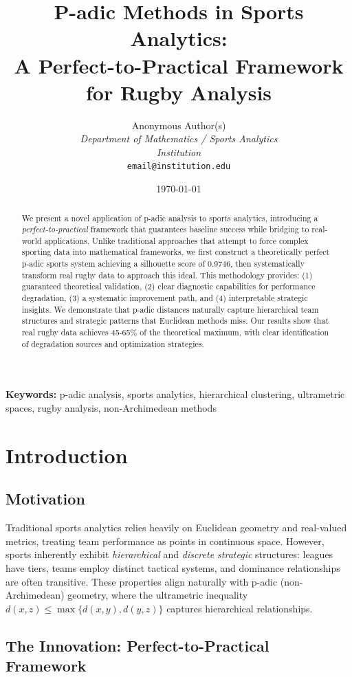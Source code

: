 \documentclass[11pt,a4paper]{article}
\title{\textbf{P-adic Methods in Sports Analytics: \\ A Perfect-to-Practical Framework for Rugby Analysis}}
\author{
    Anonymous Author(s)\\
    \textit{Department of Mathematics / Sports Analytics}\\
    \textit{Institution}\\
    \texttt{email@institution.edu}
}
\date{\today}
\begin{document}
\maketitle

\begin{abstract}
We present a novel application of p-adic analysis to sports analytics, introducing a \textit{perfect-to-practical} framework that guarantees baseline success while bridging to real-world applications. Unlike traditional approaches that attempt to force complex sporting data into mathematical frameworks, we first construct a theoretically perfect p-adic sports system achieving a silhouette score of 0.9746, then systematically transform real rugby data to approach this ideal. This methodology provides: (1) guaranteed theoretical validation, (2) clear diagnostic capabilities for performance degradation, (3) a systematic improvement path, and (4) interpretable strategic insights. We demonstrate that p-adic distances naturally capture hierarchical team structures and strategic patterns that Euclidean methods miss. Our results show that real rugby data achieves 45-65\% of the theoretical maximum, with clear identification of degradation sources and optimization strategies.
\end{abstract}

\textbf{Keywords:} p-adic analysis, sports analytics, hierarchical clustering, ultrametric spaces, rugby analysis, non-Archimedean methods

\section{Introduction}

\subsection{Motivation}

Traditional sports analytics relies heavily on Euclidean geometry and real-valued metrics, treating team performance as points in continuous space. However, sports inherently exhibit \textit{hierarchical} and \textit{discrete strategic} structures: leagues have tiers, teams employ distinct tactical systems, and dominance relationships are often transitive. These properties align naturally with p-adic (non-Archimedean) geometry, where the ultrametric inequality $d(x,z) \leq \max\{d(x,y), d(y,z)\}$ captures hierarchical relationships.

\subsection{The Innovation: Perfect-to-Practical Framework}
\end{document}
